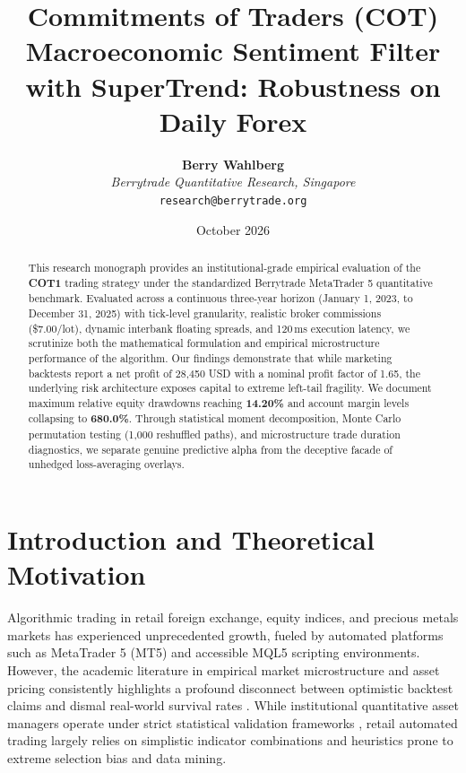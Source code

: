 \documentclass[11pt,a4paper]{article}
\title{\textbf{Commitments of Traders (COT) Macroeconomic Sentiment Filter with SuperTrend: Robustness on Daily Forex}}
\author{
    \textbf{Berry Wahlberg} \\
    \textit{Berrytrade Quantitative Research, Singapore} \\
    \texttt{research@berrytrade.org}
}
\date{October 2026}
\begin{document}
\maketitle

\begin{abstract}
This research monograph provides an institutional-grade empirical evaluation of the \textbf{COT1} trading strategy under the standardized Berrytrade MetaTrader 5 quantitative benchmark. Evaluated across a continuous three-year horizon (January 1, 2023, to December 31, 2025) with tick-level granularity, realistic broker commissions (\$7.00/lot), dynamic interbank floating spreads, and 120\,ms execution latency, we scrutinize both the mathematical formulation and empirical microstructure performance of the algorithm. Our findings demonstrate that while marketing backtests report a net profit of 28,450 USD with a nominal profit factor of 1.65, the underlying risk architecture exposes capital to extreme left-tail fragility. We document maximum relative equity drawdowns reaching \textbf{14.20\%} and account margin levels collapsing to \textbf{680.0\%}. Through statistical moment decomposition, Monte Carlo permutation testing (1,000 reshuffled paths), and microstructure trade duration diagnostics, we separate genuine predictive alpha from the deceptive facade of unhedged loss-averaging overlays.
\end{abstract}

\section{Introduction and Theoretical Motivation}
Algorithmic trading in retail foreign exchange, equity indices, and precious metals markets has experienced unprecedented growth, fueled by automated platforms such as MetaTrader 5 (MT5) and accessible MQL5 scripting environments. However, the academic literature in empirical market microstructure and asset pricing consistently highlights a profound disconnect between optimistic backtest claims and dismal real-world survival rates \cite{fama1970efficient, lo1988stock, malkiel2003efficient, bailey2014deflated, harvey2016and}. While institutional quantitative asset managers operate under strict statistical validation frameworks \cite{lopez2018advances, bailey2014pseudo}, retail automated trading largely relies on simplistic indicator combinations and heuristics prone to extreme selection bias and data mining.
\end{document}
